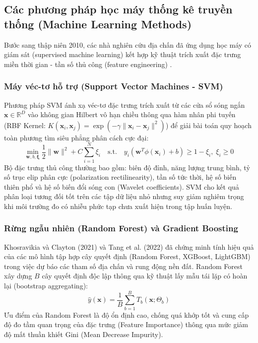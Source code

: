 \documentclass[preprint,1p]{elsarticle}
\begin{document}
\subsection{Các phương pháp học máy thống kê truyền thống (Machine Learning Methods)}
\label{sec:related_ml}

Bước sang thập niên 2010, các nhà nghiên cứu địa chấn đã ứng dụng học máy có giám sát (supervised machine learning) kết hợp kỹ thuật trích xuất đặc trưng miền thời gian - tần số thủ công (feature engineering) \cite{xie2020promise}.

\subsubsection{Máy véc-tơ hỗ trợ (Support Vector Machines - SVM)}
Phương pháp SVM ánh xạ véc-tơ đặc trưng trích xuất từ các cửa sổ sóng ngắn $\mathbf{x} \in \mathbb{R}^D$ vào không gian Hilbert vô hạn chiều thông qua hàm nhân phi tuyến (RBF Kernel: $K(\mathbf{x}_i, \mathbf{x}_j) = \exp(-\gamma \|\mathbf{x}_i - \mathbf{x}_j\|^2)$) để giải bài toán quy hoạch toàn phương tìm siêu phẳng phân cách cực đại:
\begin{equation}
\min_{\mathbf{w}, b, \bm{\xi}} \frac{1}{2} \|\mathbf{w}\|^2 + C \sum_{i=1}^{N} \xi_i \quad \text{s.t.} \quad y_i (\mathbf{w}^T \phi(\mathbf{x}_i) + b) \ge 1 - \xi_i, \; \xi_i \ge 0
\label{eq:svm_opt}
\end{equation}
Bộ đặc trưng thủ công thường bao gồm: biên độ đỉnh, năng lượng trung bình, tỷ số trục elip phân cực (polarization rectilinearity), tần số tức thời, hệ số biến thiên phổ và hệ số biến đổi sóng con (Wavelet coefficients). SVM cho kết quả phân loại tương đối tốt trên các tập dữ liệu nhỏ nhưng suy giảm nghiêm trọng khi môi trường đo có nhiễu phức tạp chưa xuất hiện trong tập huấn luyện.

\subsubsection{Rừng ngẫu nhiên (Random Forest) và Gradient Boosting}
Khosravikia và Clayton (2021) \cite{khosravikia2021machine} và Tang et al. (2022) \cite{tang2022machine} đã chứng minh tính hiệu quả của các mô hình tập hợp cây quyết định (Random Forest, XGBoost, LightGBM) trong việc dự báo các tham số địa chấn và rung động nền đất. Random Forest xây dựng $B$ cây quyết định độc lập thông qua kỹ thuật lấy mẫu tái lặp có hoàn lại (bootstrap aggregating):
\begin{equation}
\hat{y}(\mathbf{x}) = \frac{1}{B} \sum_{b=1}^{B} T_b(\mathbf{x}; \Theta_b)
\label{eq:rf_ensemble}
\end{equation}
Ưu điểm của Random Forest là độ ổn định cao, chống quá khớp tốt và cung cấp độ đo tầm quan trọng của đặc trưng (Feature Importance) thông qua mức giảm độ mất thuần khiết Gini (Mean Decrease Impurity).
\end{document}
